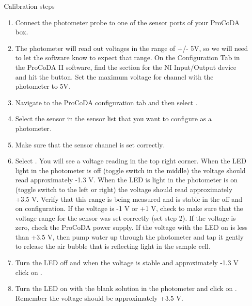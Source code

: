 \documentclass[letterpaper,10pt,english]{sphinxmanual}
\begin{document}
Calibration steps
\begin{enumerate}
\item {} 
Connect the photometer probe to one of the sensor ports of your ProCoDA box.

\item {} 
The photometer will read out voltages in the range of +/- 5V, so we will need to let the software know to expect that range. On the Configuration Tab in the ProCoDA II software, find the section for the NI Input/Output device and hit the  button. Set the maximum voltage for channel with the photometer to 5V.

\item {} 
Navigate to the ProCoDA configuration tab and then select .

\item {} 
Select the sensor in the sensor list that you want to configure as a photometer.

\item {} 
Make sure that the sensor channel is set correctly.

\item {} 
Select . You will see a voltage reading in the top right corner. When the LED light in the photometer is off (toggle switch in the middle) the voltage should read approximately -1.3 V. When the LED is light in the photometer is on (toggle switch to the left or right) the voltage should read approximately +3.5 V. Verify that this range is being measured and is stable in the off and on configuration. If the voltage is -1 V or +1 V, check to make sure that the voltage range for the sensor was set correctly (set step 2). If the voltage is zero, check the ProCoDA power supply. If the voltage with the LED on is less than +3.5 V, then pump water up through the photometer and tap it gently to release the air bubble that is reflecting light in the sample cell.

\item {} 
Turn the LED off and when the voltage is stable and approximately -1.3 V click on .

\item {} 
Turn the LED on with the blank solution in the photometer and click on . Remember the voltage should be approximately +3.5 V.

\end{enumerate}
\end{document}
